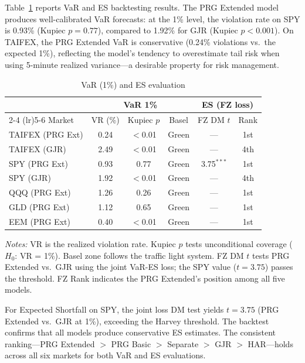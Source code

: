 \documentclass[11pt,a4paper]{article}
\begin{document}
Table~\ref{tab:var_es} reports VaR and ES backtesting results. The PRG Extended model produces well-calibrated VaR forecasts: at the 1\% level, the violation rate on SPY is 0.93\% (Kupiec $p = 0.77$), compared to 1.92\% for GJR (Kupiec $p < 0.001$). On TAIFEX, the PRG Extended VaR is conservative (0.24\% violations vs.\ the expected 1\%), reflecting the model's tendency to overestimate tail risk when using 5-minute realized variance---a desirable property for risk management.

\begin{table}[htbp]
\centering
\caption{VaR (1\%) and ES evaluation}
\label{tab:var_es}
\small
\begin{tabular}{lccccc}
\toprule
 & \multicolumn{3}{c}{VaR 1\%} & \multicolumn{2}{c}{ES (FZ loss)} \\
\cmidrule(lr){2-4} \cmidrule(lr){5-6}
Market & VR (\%) & Kupiec $p$ & Basel & FZ DM $t$ & Rank \\
\midrule
TAIFEX (PRG Ext)   & 0.24 & $<$0.01 & Green & --- & 1st \\
TAIFEX (GJR)       & 2.49 & $<$0.01 & Green & --- & 4th \\
SPY (PRG Ext)      & 0.93 & 0.77 & Green & 3.75$^{***}$ & 1st \\
SPY (GJR)          & 1.92 & $<$0.01 & Green & --- & 4th \\
QQQ (PRG Ext)      & 1.26 & 0.26 & Green & --- & 1st \\
GLD (PRG Ext)      & 1.12 & 0.65 & Green & --- & 1st \\
EEM (PRG Ext)      & 0.40 & $<$0.01 & Green & --- & 1st \\
\bottomrule
\end{tabular}
\begin{flushleft}
\footnotesize
\emph{Notes:} VR is the realized violation rate. Kupiec $p$ tests unconditional coverage ($H_0$: VR = 1\%). Basel zone follows the traffic light system. FZ DM $t$ tests PRG Extended vs.\ GJR using the \citet{Fissler2016} joint VaR-ES loss; the SPY value ($t = 3.75$) passes the \citet{Harvey2016} threshold. FZ Rank indicates the PRG Extended's position among all five models.
\end{flushleft}
\end{table}

For Expected Shortfall on SPY, the \citet{Fissler2016} joint loss DM test yields $t = 3.75$ (PRG Extended vs.\ GJR at 1\%), exceeding the Harvey threshold. The \citet{Acerbi2014} backtest confirms that all models produce conservative ES estimates. The consistent ranking---PRG Extended $>$ PRG Basic $>$ Separate $>$ GJR $>$ HAR---holds across all six markets for both VaR and ES evaluations.
\end{document}
